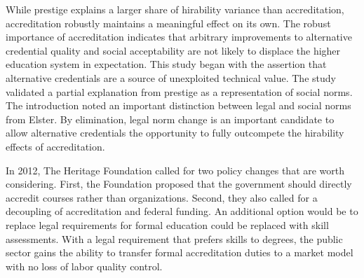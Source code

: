 \documentclass[review]{elsarticle}
\begin{document}
While prestige explains a larger share of hirability variance than accreditation, accreditation robustly maintains a meaningful effect on its own.
The robust importance of accreditation indicates that arbitrary improvements to alternative credential
quality and social acceptability are not likely to displace the higher education system in expectation.
This study began with the assertion that alternative credentials are a source of unexploited technical value.
The study validated a partial explanation from prestige as a representation of social norms.
The introduction noted an important distinction between legal and social norms from Elster.
By elimination, legal norm change is an important candidate to allow alternative credentials the opportunity
to fully outcompete the hirability effects of accreditation.


In 2012, The Heritage Foundation called for two policy changes that are worth considering.
First, the Foundation proposed that the government should directly accredit courses rather than organizations\cite{burke2012accreditation}.
Second, they also called for a decoupling of accreditation and federal funding.
An additional option would be to replace legal requirements for formal education could be replaced with skill assessments.
With a legal requirement that prefers skills to degrees,
the public sector gains the ability to transfer formal accreditation duties to a market model with no loss of labor quality control.
\end{document}
